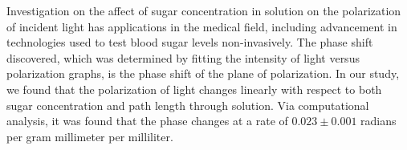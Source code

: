 Investigation on the affect of sugar concentration in solution on the polarization of incident light has applications in the medical field, including advancement in technologies used to test blood sugar levels non-invasively. The phase shift discovered, which was determined by fitting the intensity of light versus polarization graphs, is the phase shift of the plane of polarization. In our study, we found that the polarization of light changes linearly with respect to both sugar concentration and path length through solution. Via computational analysis, it was found that the phase changes at a rate of $0.023 \pm 0.001$ radians per gram millimeter per milliliter.